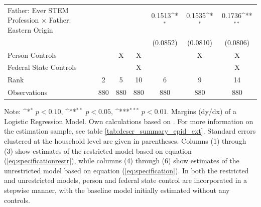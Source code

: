 \documentclass[a4paper, oneside, hyperfootnotes = false]{article}
\def\sym#1{\ifmmode^{#1}\else\(^{#1}\)\fi}
\begin{document}
{\begin{landscape}
\begin{table}[ht]
\begin{center}
{\begin{tabular}{l*{6}{c}}
					\addlinespace
					Father: Ever STEM Profession $\times$ Father: Eastern Origin&                     &                     &                     &      0.1513\sym{*}  &      0.1535\sym{*}  &      0.1736\sym{**} \\
					&                     &                     &                     &    (0.0852)         &    (0.0810)         &    (0.0806)         \\
					\midrule
					Person Controls & & X  & X & & X & X \\
					Federal State Controls & & & X & & & X \\
					Rank                &      2         &      5         &     10         &      6         &      9         &     14         \\
					Observations                   &    880         &    880         &    880         &    880         &    880         &    880         \\
					\bottomrule
			\end{tabular}}
			
			\vspace{2mm}
			
			\parbox{15cm}{
				\linespread{1}\footnotesize Note: \sym{*} \(p<0.10\), \sym{**} \(p<0.05\), \sym{***} \(p<0.01\). Margins (dy/dx) of a Logistic Regression Model. Own calculations based on \cite{SOEP2023}. For more information on the estimation sample, see table \ref{tab:descr_summary_epid_ext}. Standard errors clustered at the household level are given in parentheses. Columns (1) through (3) show estimates of the restricted model based on equation (\ref{eq:specificationrestr}), while columns (4) through (6) show estimates of the unrestricted model based on equation (\ref{eq:specification}). In both the restricted and unrestricted models, person and federal state control are incorporated in a stepwise manner, with the baseline model initially estimated without any controls.}
			
		\end{center}
	\end{table}
\end{landscape}

}
\end{document}
